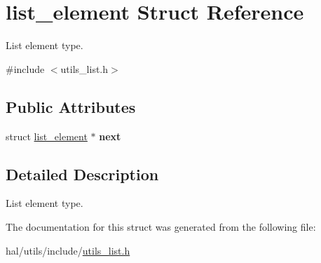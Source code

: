 \hypertarget{structlist__element}{}\section{list\+\_\+element Struct Reference}
\label{structlist__element}


List element type.  




{\ttfamily \#include $<$utils\+\_\+list.\+h$>$}

\subsection*{Public Attributes}
\begin{DoxyCompactItemize}
\item 
\mbox{\label{structlist__element_a66e1becb179745b2a4070941b9a4052d}} 
struct \hyperlink{structlist__element}{list\+\_\+element} $\ast$ {\bfseries next}
\end{DoxyCompactItemize}


\subsection{Detailed Description}
List element type. 

The documentation for this struct was generated from the following file\+:\begin{DoxyCompactItemize}
\item 
hal/utils/include/\hyperlink{utils__list_8h}{utils\+\_\+list.\+h}\end{DoxyCompactItemize}
